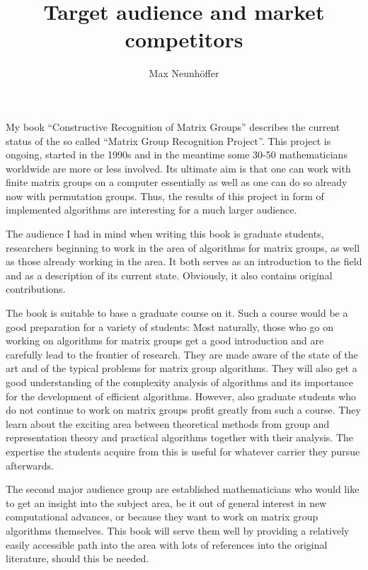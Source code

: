 \documentclass[11pt]{article}
\begin{document}
\title{Target audience and market competitors}
\author{Max Neunh\"offer}
\maketitle

My book ``Constructive Recognition of Matrix Groups'' describes the
current status of the so called ``Matrix Group Recognition Project''.
This project is ongoing, started in the 1990s and in the meantime
some 30-50 mathematicians worldwide are more or less involved.
Its ultimate aim is that one can work with finite matrix groups
on a computer essentially as well as one can do so already now with
permutation groups. Thus, the results of this project in form of
implemented algorithms are interesting for a much larger audience.

The audience I had in mind when writing this book is graduate
students, researchers beginning to work in the area of
algorithms for matrix groups, as well as those already working
in the area. It both serves as an introduction to the field and
as a description of its current state. Obviously, it also contains
original contributions.

The book is suitable to base a graduate course on it. Such a course
would be a good preparation for a variety of students: Most naturally, 
those who go on working on algorithms for matrix groups get
a good introduction and are carefully lead to the frontier of research.
They are made aware of the state of the art and of the typical problems
for matrix group algorithms. They will also get a good understanding
of the complexity analysis of algorithms and its importance for the
development of efficient algorithms.
However, also graduate students who do not continue to work
on matrix groups profit greatly from such a course. They learn about 
the exciting area between theoretical methods from group and representation
theory and practical algorithms together with their analysis. The expertise
the students acquire from this is useful for whatever carrier they pursue
afterwards.

The second major audience group are established mathematicians who would
like to get an insight into the subject area, be it out of general interest
in new computational advances, or because they want to work on matrix
group algorithms themselves. This book will serve them well by providing
a relatively easily accessible path into the area with lots of references
into the original literature, should this be needed.
\end{document}
